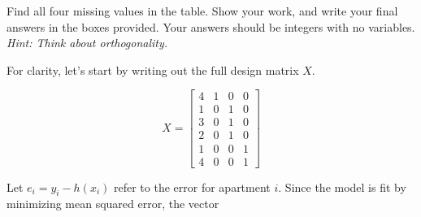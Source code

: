 \documentclass[11pt]{article}
\begin{document}
\begin{prob}
Find all four missing values in the table. Show your work, and write your final answers in the boxes provided. Your answers should be integers with no variables. \textit{Hint: Think about orthogonality.}

\vspace{-0.1in}

\noindent
{}

\begin{solution}
For clarity, let's start by writing out the full design matrix $X$.

$$X = \begin{bmatrix} 
  4 & 1 & 0 & 0 \\
  1 & 0 & 1 & 0 \\ 
  3 & 0 & 1 & 0 \\ 
  2 & 0 & 1 & 0 \\ 
  1 & 0 & 0 & 1 \\ 
  4 & 0 & 0 & 1 \end{bmatrix}$$

Let $e_i = y_i-h(x_i)$ refer to the error for apartment $i$. Since the model is fit by minimizing mean squared error, the vector


\end{solution}
\end{prob}
\end{document}
